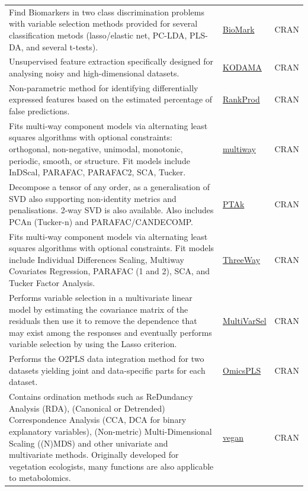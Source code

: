 \documentclass[]{article}
\begin{document}
\begin{longtable}[t]{>{\raggedright\arraybackslash}p{30em}>{\raggedright\arraybackslash}p{10em}>{\raggedright\arraybackslash}p{3em}}
\rowcolor{gray!6}  Find Biomarkers in two class discrimination problems with variable selection methods provided for several classification metods (lasso/elastic net, PC-LDA, PLS-DA, and several t-tests). & \href{https://cran.r-project.org/web/packages/BioMark/index.html}{BioMark} & CRAN\\
Unsupervised feature extraction specifically designed for analysing noisy and high-dimensional datasets. & \href{https://cran.r-project.org/package=KODAMA}{KODAMA} & CRAN\\
\rowcolor{gray!6}  Non-parametric method for identifying differentially expressed features based on the estimated percentage of false predictions. & \href{https://doi.org/doi:10.18129/B9.bioc.RankProd}{RankProd} & CRAN\\
Fits multi-way component models via alternating least squares algorithms with optional constraints: orthogonal, non-negative, unimodal, monotonic, periodic, smooth, or structure. Fit models include InDScal, PARAFAC, PARAFAC2, SCA, Tucker. & \href{https://cran.r-project.org/package=multiway}{multiway} & CRAN\\
\rowcolor{gray!6}  Decompose a tensor of any order, as a generalisation of SVD also supporting non-identity metrics and penalisations. 2-way SVD is also available. Also includes PCAn (Tucker-n) and PARAFAC/CANDECOMP. & \href{https://cran.r-project.org/package=PTAk}{PTAk} & CRAN\\
Fits multi-way component models via alternating least squares algorithms with optional constraints. Fit models include Individual Differences Scaling, Multiway Covariates Regression, PARAFAC (1 and 2), SCA, and Tucker Factor Analysis. & \href{https://cran.r-project.org/package=ThreeWay}{ThreeWay} & CRAN\\
\rowcolor{gray!6}  Performs variable selection in a multivariate linear model by estimating the covariance matrix of the residuals then use it to remove the dependence that may exist among the responses and eventually performs variable selection by using the Lasso criterion. & \href{https://cran.r-project.org/package=MultiVarSel}{MultiVarSel} & CRAN\\
Performs the O2PLS data integration method for two datasets yielding joint and data-specific parts for each dataset. & \href{https://cran.r-project.org/package=OmicsPLS}{OmicsPLS} & CRAN\\
\rowcolor{gray!6}  Contains ordination methods such as ReDundancy Analysis (RDA), (Canonical or Detrended) Correspondence Analysis (CCA, DCA for binary explanatory variables), (Non-metric) Multi-Dimensional Scaling ((N)MDS) and other univariate and multivariate methods. Originally developed for vegetation ecologists, many functions are also applicable to metabolomics. & \href{https://cran.r-project.org/package=vegan}{vegan} & CRAN\\

\end{longtable}
\end{document}
